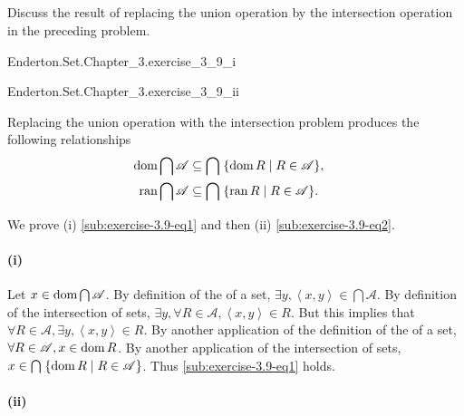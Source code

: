\documentclass{report}
\begin{document}
\subsection{}%
\label{sub:exercise-3.9}

Discuss the result of replacing the union operation by the intersection
  operation in the preceding problem.

\begin{answer}

  \statementpadding

    {Enderton.Set.Chapter\_3.exercise\_3\_9\_i}

    {Enderton.Set.Chapter\_3.exercise\_3\_9\_ii}

  Replacing the union operation with the intersection problem produces the
    following relationships
    \begin{align}
      \mathop{\text{dom}}{\bigcap{\mathscr{A}}}
        & \subseteq \bigcap\;\{ \mathop{\text{dom}}{R} \mid R \in \mathscr{A} \},
        & \label{sub:exercise-3.9-eq1} \\
      \mathop{\text{ran}}{\bigcap{\mathscr{A}}}
        & \subseteq \bigcap\;\{ \mathop{\text{ran}}{R} \mid R \in \mathscr{A} \}.
        & \label{sub:exercise-3.9-eq2}
    \end{align}

  We prove (i) \eqref{sub:exercise-3.9-eq1} and then (ii)
    \eqref{sub:exercise-3.9-eq2}.

  \paragraph{(i)}%

    Let $x \in \mathop{\text{dom}}{\bigcap{\mathscr{A}}}$.
    By definition of the  of a set,
      $\exists y, \left< x, y \right> \in \bigcap{\mathscr{A}}$.
    By definition of the intersection of sets,
      $\exists y, \forall R \in \mathscr{A}, \left< x, y \right> \in R$.
    But this implies that
      $\forall R \in \mathscr{A}, \exists y, \left< x, y \right> \in R$.
    By another application of the definition of the  of a
      set, $\forall R \in \mathscr{A}, x \in \mathop{\text{dom}}{R}$.
    By another application of the intersection of sets,
      $x \in \bigcap\;\{ \mathop{\text{dom}}{R} \mid R \in \mathscr{A} \}$.
      Thus \eqref{sub:exercise-3.9-eq1} holds.

  \paragraph{(ii)}%


\end{answer}
\end{document}
